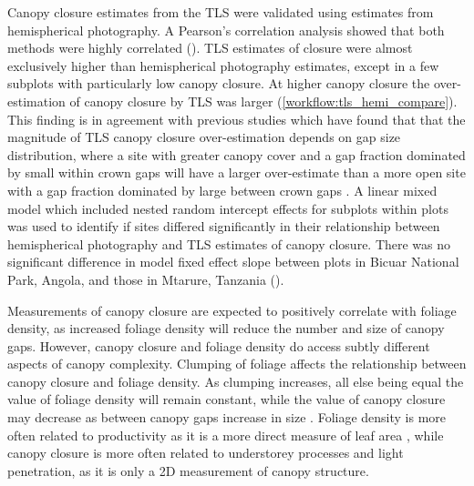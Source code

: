 \begin{refsection}
Canopy closure estimates from the TLS were validated using estimates from hemispherical photography. A Pearson's correlation analysis showed that both methods were highly correlated (\hemiCor{}). TLS estimates of closure were almost exclusively higher than hemispherical photography estimates, except in a few subplots with particularly low canopy closure. At higher canopy closure the over-estimation of canopy closure by TLS was larger (\autoref{workflow:tls_hemi_compare}). This finding is in agreement with previous studies which have found that that the magnitude of TLS canopy closure over-estimation depends on gap size distribution, where a site with greater canopy cover and a gap fraction dominated by small within crown gaps will have a larger over-estimate than a more open site with a gap fraction dominated by large between crown gaps \citep{Seidel2012}. A linear mixed model which included nested random intercept effects for subplots within plots was used to identify if sites differed significantly in their relationship between hemispherical photography and TLS estimates of canopy closure. There was no significant difference in model fixed effect slope between plots in Bicuar National Park, Angola, and those in Mtarure, Tanzania (\hemiLme{}). 

Measurements of canopy closure are expected to positively correlate with foliage density, as increased foliage density will reduce the number and size of canopy gaps. However, canopy closure and foliage density do access subtly different aspects of canopy complexity. Clumping of foliage affects the relationship between canopy closure and foliage density. As clumping increases, all else being equal the value of foliage density will remain constant, while the value of canopy closure may decrease as between canopy gaps increase in size \citep{Beland2021a}. Foliage density is more often related to productivity as it is a more direct measure of leaf area \citep{Seidel2013}, while canopy closure is more often related to understorey processes and light penetration, as it is only a 2D measurement of canopy structure. 


\end{refsection}
